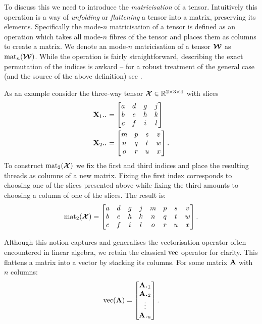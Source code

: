 To discuss
this we need to introduce the \emph{matricisation} of a tensor. Intuitively this
operation is a way of \emph{unfolding} or \emph{flattening} a tensor into a matrix,
preserving its elements. Specifically the mode-\(n\)
matricisation of a tensor is defined as an operation which takes all mode-\(n\) fibres
of the tensor and places them as columns to create a matrix. We denote an mode-\(n\)
matricisation of a tensor \(\bm{\mathcal{W}}\) as \(\operatorname{mat}_n(\bm{\mathcal{W}})\). While the operation is
fairly straightforward, describing the exact permutation of the indices is awkard -- 
for a robust treatment of the general case (and the source of the above definition) see
\autocite{Kolda2009}. 

As an example consider the three-way tensor \(\bm{\mathcal{X}} \in \mathbb{R}^{2 \times 3 \times 4}\)
with slices
\begin{align} \label{eq:slicies}
	\mat{X}_{1 \midbullet \midbullet} &= \begin{bmatrix}
		a & d & g & j \\
		b & e & h & k \\
		c & f & i & l \\
	\end{bmatrix} \\
	\mat{X}_{2 \midbullet \midbullet} &= \begin{bmatrix}
		m & p & s & v \\
		n & q & t & w \\
		o & r & u & x \\
	\end{bmatrix}.
\end{align} To construct \(\operatorname{mat}_2(\bm{\mathcal{X}})\) we fix the first and third indices and place the
resulting threads as columns of a new matrix. Fixing the first index corresponds to choosing one of
the slices presented above while fixing the third amounts to choosing a column of one of the slices.
The result is:
\begin{equation}\label{eq:matricisedeg}
	\operatorname{mat}_2(\bm{\mathcal{X}}) = \begin{bmatrix}
		a & d & g & j & m & p & s & v \\
		b & e & h & k & n & q & t & w \\
		c & f & i & l & o & r & u & x
	\end{bmatrix}.
\end{equation}

Although this notion captures and generalises the vectorisation operator often
encountered in linear algebra, we retain the classical \(\operatorname{vec}\) operator for clarity.
This flattens a matrix into a vector by stacking its columns. For some matrix \(\mathbf{A}\) with
\(n\) columns:
\begin{equation}\label{eq:vec}
	\vect(\mat{A}) = \begin{bmatrix}
		\vec{A}_{\midbullet 1}\\
		\vec{A}_{\midbullet 2}\\
		\vdots\\
		\vec{A}_{\midbullet n}
	\end{bmatrix}.
\end{equation}

